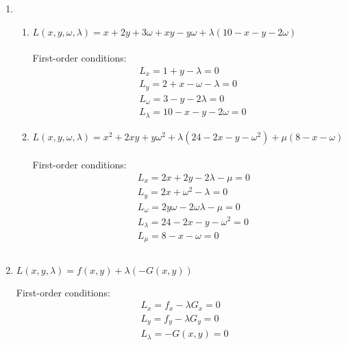 \documentclass{./../../Latex/homework}
\begin{document}
\begin{enumerate}
\item 

\begin{enumerate}
\item $L(x, y, \omega, \lambda)=x+2 y+3 \omega+x y-y \omega+\lambda(10-x-y-2 \omega)$ \\~\\
First-order conditions:
$$
\begin{aligned}
&L_{x}=1+y-\lambda=0 \\
&L_{y}=2+x-\omega-\lambda=0 \\
&L_{\omega}=3-y-2 \lambda=0 \\
&L_{\lambda}=10-x-y-2 \omega=0
\end{aligned}
$$

\item
$ L(x, y, \omega, \lambda)=x^{2}+2 x y+y \omega^{2}+\lambda\left(24-2 x-y-\omega^{2}\right)+\mu(8-x-\omega)$ \\~\\
First-order conditions:
$$
\begin{aligned}
&L_{x}=2 x+2 y-2 \lambda-\mu=0 \\
&L_{y}=2 x+\omega^{2}-\lambda=0 \\
&L_{\omega}=2 y \omega-2 \omega \lambda-\mu=0 \\
&L_{\lambda}=24-2 x-y-\omega^{2}=0 \\
&L_{\mu}=8-x-\omega=0 \\~\\
\end{aligned}
$$
\end{enumerate}

\item  $L(x, y, \lambda)=f(x, y)+\lambda(-G(x, y))$ 

First-order conditions:
$$
\begin{aligned}
&L_{x}=f_{x}-\lambda G_{x}=0 \\
&L_{y}=f_{y}-\lambda G_{y}=0 \\
&L_{\lambda}=-G(x, y)=0
\end{aligned}
$$
\end{enumerate}
\end{document}
